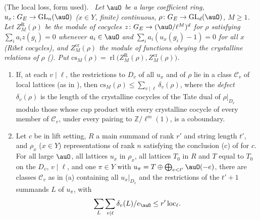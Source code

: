 \documentclass[10pt]{amsart}
\theoremstyle{definition}
\theoremstyle{remark}
\newcommand{\Z}{\mathbb Z}
\providecommand{\auGL}{\mathrm{GL}}
\providecommand{\pgG}{G_E}
\providecommand{\pgloc}{\mathrm{loc}}
\providecommand{\prics}{\mathrm{cs}}
\providecommand{\prirl}{\operatorname{rl}}
\newenvironment{quotedthm}[2]{\par\medskip\noindent\begingroup
  \textbf{#1}#2.\ \itshape\ignorespaces}{\endgroup\par\medskip}
\begin{document}
\begin{quotedthm}{\cite[Proposition~4.5]{P55}}{ (The local loss, form used)}
Let $\auO$ be a large coefficient ring, $u_x\colon\pgG\to\auGL_n(\auO)$ ($x\in Y$, finite)
continuous, $\rho\colon\pgG\to\auGL_{d}(\auO)$, $M\ge1$. Let $Z^{\mathrm R}_M(\rho)$ be the module of
cocycles $z\colon\pgG\to(\auO/\ell^M)^d$ for $\rho$ satisfying $\sum_ia_iz(g_i)=0$ whenever
$a_i\in\auO$ and $\sum_ia_i(u_x(g_i)-1)=0$ for all $x$ (\emph{Ribet cocycles}), and
$Z^{\mathrm{cr}}_M(\rho)$ the module of functions obeying the crystalline relations of $\rho$
({\cite[Definition~2.7]{P55}}). Put $\prics_M(\rho)=\prirl\bigl(Z^{\mathrm R}_M(\rho),
Z^{\mathrm{cr}}_M(\rho)\bigr)$.
\begin{enumerate}
\item[(a)] If, at each $v\mid\ell$, the restrictions to $D_v$ of all $u_x$ and of $\rho$ lie in a
class $\mathcal C_v$ of local lattices (as in {\cite[Proposition~2.28]{P55}}), then
$\prics_M(\rho)\le\sum_{v\mid\ell}\delta_v(\rho)$, where the \emph{defect} $\delta_v(\rho)$ is the
length of the crystalline cocycles of the Tate dual of $\rho|_{D_v}$ modulo those whose cup product
with every crystalline cocycle of every member of $\mathcal C_v$, under every pairing to
$\Z/\ell^m(1)$, is a coboundary.
\item[(b)] Let $c$ be in lift setting, $R$ a main summand of rank $r'$ and string length $t'$,
and $\rho_x$ ($x\in Y$) representations of rank $n$ satisfying the conclusion (c) of
{\cite[Proposition~4.6]{P55}} for $c$. For all large $\auO$, all lattices $u_x$ in $\rho_x$, all
lattices $T_0$ in $R$ and $T$ equal to $T_0$ on the $D_v$, $v\mid\ell$, and one $\pi\in Y$ with
$u_\pi=T\oplus\bigoplus_{e<t'}\auO(-e)$, there are classes $\mathcal C_v$ as in (a) containing all
$u_x|_{D_v}$ and the restrictions of the $t'+1$ summands $L$ of $u_\pi$, with
\[
\sum_{L}\sum_{v\mid\ell}\delta_v(L)/e_\auO\le r'\,\pgloc_\ell .
\]
\end{enumerate}
\end{quotedthm}
\end{document}
